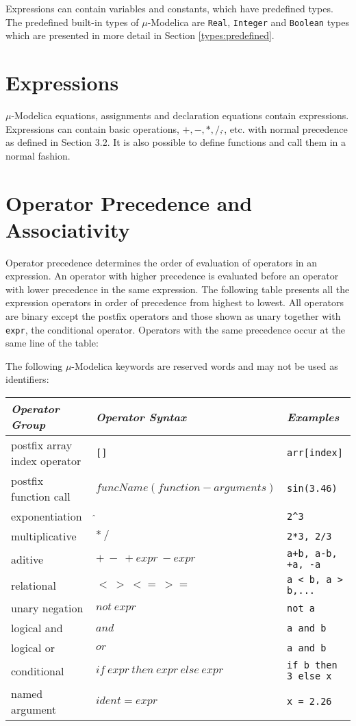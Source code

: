 \documentclass[11pt,a4paper,notitlepage]{report}
\begin{document}
Expressions can contain variables and constants, which have predefined types. The predefined
built-in types of $\mu$-Modelica are \verb"Real", \verb"Integer" and \verb"Boolean" types which are presented in more detail in Section \ref{types:predefined}. 

\section{Expressions}

$\mu$-Modelica equations, assignments and declaration equations contain expressions.
Expressions can contain basic operations, $+, -, *, /, \hat{}$, etc. with normal precedence as defined in Section 3.2. It is also possible to define functions and call them in a normal fashion.

\section{Operator Precedence and Associativity}

Operator precedence determines the order of evaluation of operators in an expression. An operator with higher precedence is evaluated before an operator with lower precedence in the same expression.
The following table presents all the expression operators in order of precedence from highest to lowest. All operators are binary except the postfix operators and those shown as unary together with \verb"expr", the conditional operator. Operators with the same precedence occur at the same line of the table:

\FloatBarrier
The following $\mu$-Modelica keywords are reserved words and may not be used as identifiers:
\begin{center}
\begin{tabular}{|p{1in}|p{2in}|p{1.5in}|}
	\hline
	\emph{Operator Group} & \emph{Operator Syntax} & \emph{Examples} \\	
	\hline
	postfix array index operator & \verb"[]" & \verb"arr[index]" \\
	\hline
	postfix function call & $funcName(function-arguments)$ & \verb"sin(3.46)" \\
	\hline	
	exponentiation & $\hat{}$ & \verb"2^3" \\
	\hline 	 
	multiplicative & $*\ /$ & \verb"2*3, 2/3" \\ 
	\hline	
	aditive & $+\ -\ +expr\ -expr$ & \verb"a+b, a-b, +a, -a" \\
	\hline
	relational & $<\ >\ <=\ >=$ & \verb"a < b, a > b,..." \\
	\hline
	unary negation & $not\ expr$ & \verb"not a" \\
	\hline
	logical and & $and$ & \verb"a and b" \\
	\hline
	logical or & $or$ & \verb"a and b" \\
	\hline
	conditional & $if\ expr\ then\ expr\ else\ expr$ & \verb"if b then 3 else x" \\
	\hline
	named argument & $ident = expr$ & \verb"x = 2.26" \\
	\hline
\end{tabular}
\end{center}
\end{document}
